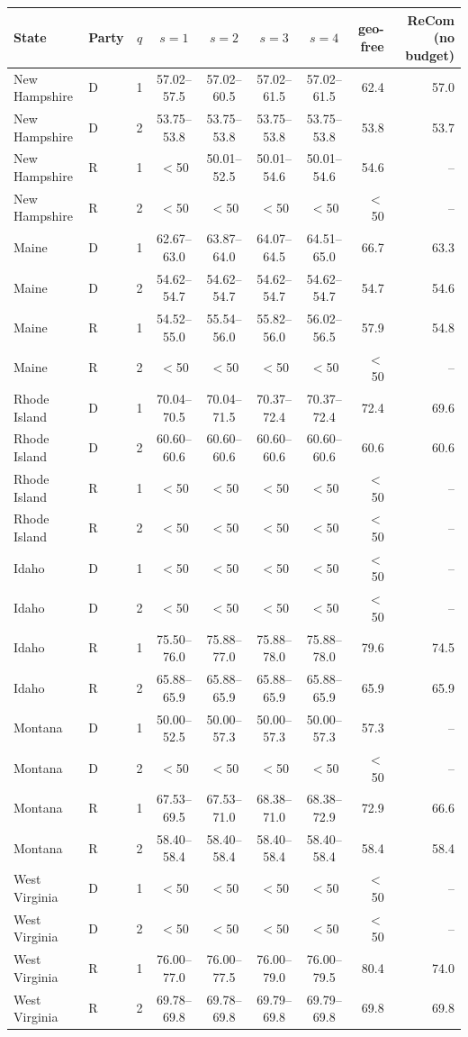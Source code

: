 \begin{tabular}{llcccccrr}
\toprule
State & Party & $q$ & $s=1$ & $s=2$ & $s=3$ & $s=4$ & geo-free & ReCom (no budget) \\
\midrule
New Hampshire & D & 1 & 57.02--57.5 & 57.02--60.5 & 57.02--61.5 & 57.02--61.5 & 62.4 & 57.0 \\
New Hampshire & D & 2 & 53.75--53.8 & 53.75--53.8 & 53.75--53.8 & 53.75--53.8 & 53.8 & 53.7 \\
New Hampshire & R & 1 & $<$50 & 50.01--52.5 & 50.01--54.6 & 50.01--54.6 & 54.6 & -- \\
New Hampshire & R & 2 & $<$50 & $<$50 & $<$50 & $<$50 & $<$50 & -- \\
Maine & D & 1 & 62.67--63.0 & 63.87--64.0 & 64.07--64.5 & 64.51--65.0 & 66.7 & 63.3 \\
Maine & D & 2 & 54.62--54.7 & 54.62--54.7 & 54.62--54.7 & 54.62--54.7 & 54.7 & 54.6 \\
Maine & R & 1 & 54.52--55.0 & 55.54--56.0 & 55.82--56.0 & 56.02--56.5 & 57.9 & 54.8 \\
Maine & R & 2 & $<$50 & $<$50 & $<$50 & $<$50 & $<$50 & -- \\
Rhode Island & D & 1 & 70.04--70.5 & 70.04--71.5 & 70.37--72.4 & 70.37--72.4 & 72.4 & 69.6 \\
Rhode Island & D & 2 & 60.60--60.6 & 60.60--60.6 & 60.60--60.6 & 60.60--60.6 & 60.6 & 60.6 \\
Rhode Island & R & 1 & $<$50 & $<$50 & $<$50 & $<$50 & $<$50 & -- \\
Rhode Island & R & 2 & $<$50 & $<$50 & $<$50 & $<$50 & $<$50 & -- \\
Idaho & D & 1 & $<$50 & $<$50 & $<$50 & $<$50 & $<$50 & -- \\
Idaho & D & 2 & $<$50 & $<$50 & $<$50 & $<$50 & $<$50 & -- \\
Idaho & R & 1 & 75.50--76.0 & 75.88--77.0 & 75.88--78.0 & 75.88--78.0 & 79.6 & 74.5 \\
Idaho & R & 2 & 65.88--65.9 & 65.88--65.9 & 65.88--65.9 & 65.88--65.9 & 65.9 & 65.9 \\
Montana & D & 1 & 50.00--52.5 & 50.00--57.3 & 50.00--57.3 & 50.00--57.3 & 57.3 & -- \\
Montana & D & 2 & $<$50 & $<$50 & $<$50 & $<$50 & $<$50 & -- \\
Montana & R & 1 & 67.53--69.5 & 67.53--71.0 & 68.38--71.0 & 68.38--72.9 & 72.9 & 66.6 \\
Montana & R & 2 & 58.40--58.4 & 58.40--58.4 & 58.40--58.4 & 58.40--58.4 & 58.4 & 58.4 \\
West Virginia & D & 1 & $<$50 & $<$50 & $<$50 & $<$50 & $<$50 & -- \\
West Virginia & D & 2 & $<$50 & $<$50 & $<$50 & $<$50 & $<$50 & -- \\
West Virginia & R & 1 & 76.00--77.0 & 76.00--77.5 & 76.00--79.0 & 76.00--79.5 & 80.4 & 74.0 \\
West Virginia & R & 2 & 69.78--69.8 & 69.78--69.8 & 69.79--69.8 & 69.79--69.8 & 69.8 & 69.8 \\
\bottomrule
\end{tabular}
